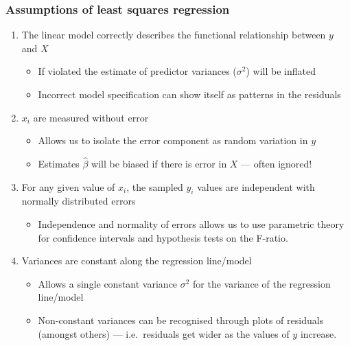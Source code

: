 \documentclass{beamer}
\begin{document}
\begin{frame}
   \frametitle{Assumptions of least squares regression}
   \begin{enumerate}
      \item The linear model correctly describes the functional relationship between $y$ and $X$
      \begin{itemize}
         \item If violated the estimate of predictor variances ($\sigma^2$) will be inflated
         \item Incorrect model specification can show itself as patterns in the residuals
      \end{itemize}
      \item $x_i$ are measured without error
      \begin{itemize}
         \item Allows us to isolate the error component as random variation in $y$
         \item Estimates $\hat{\beta}$ will be biased if there is error in $X$ --- often ignored!
      \end{itemize}
      \item For any given value of $x_i$, the sampled $y_i$ values are independent with normally distributed errors
      \begin{itemize}
         \item Independence and normality of errors allows us to use parametric theory for confidence intervals and hypothesis tests on the F-ratio.
      \end{itemize}
      \item Variances are constant along the regression line/model
      \begin{itemize}
         \item Allows a single constant variance $\sigma^2$ for the variance of the regression line/model
         \item Non-constant variances can be recognised through plots of residuals (amongst others) --- i.e.~residuals get wider as the values of $y$ increase.
      \end{itemize}
   \end{enumerate}
\end{frame}
\end{document}
